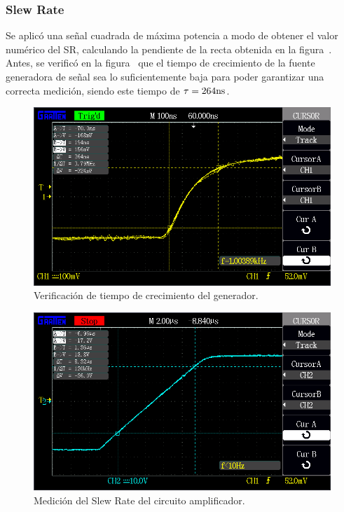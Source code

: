 \vfill

\clearpage

\subsubsection{Slew Rate}

Se aplicó una señal cuadrada de máxima potencia a modo de obtener el valor numérico del SR, calculando la pendiente de la recta obtenida en la figura~. Antes, se verificó en la figura~ que el tiempo de crecimiento de la fuente generadora de señal sea lo suficientemente baja para poder garantizar una correcta medición, siendo este tiempo de $\tau = 264 \si[per-mode=symbol]{\nano\second}$.


\begin{figure}[H]
        \centering
        \includegraphics[width=0.95 \textwidth]{./img/mediciones/Slew_Rate/1.png}
        \caption{Verificación de tiempo de crecimiento del generador.}
        \label{fig:Slew_rate_gen}
\end{figure}

\vfill

\clearpage

\begin{figure}[H]
        \centering
        \includegraphics[width=0.95 \textwidth]{./img/mediciones/Slew_Rate/2.png}
        \caption{Medición del Slew Rate del circuito amplificador.}
        \label{fig:Slew_rate_amplifier}
\end{figure}

